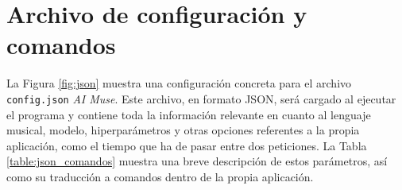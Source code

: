 
\section{Archivo de configuración y comandos}

La Figura \ref{fig:json} muestra una configuración concreta para el archivo \texttt{config.json} \emph{AI Muse}. Este archivo, en formato JSON, será cargado al ejecutar el programa y contiene toda la información relevante en cuanto al lenguaje musical, modelo, hiperparámetros y otras opciones referentes a la propia aplicación, como el tiempo que ha de pasar entre dos peticiones. La Tabla \ref{table:json_comandos} muestra una breve descripción de estos parámetros, así como su traducción a comandos dentro de la propia aplicación.





